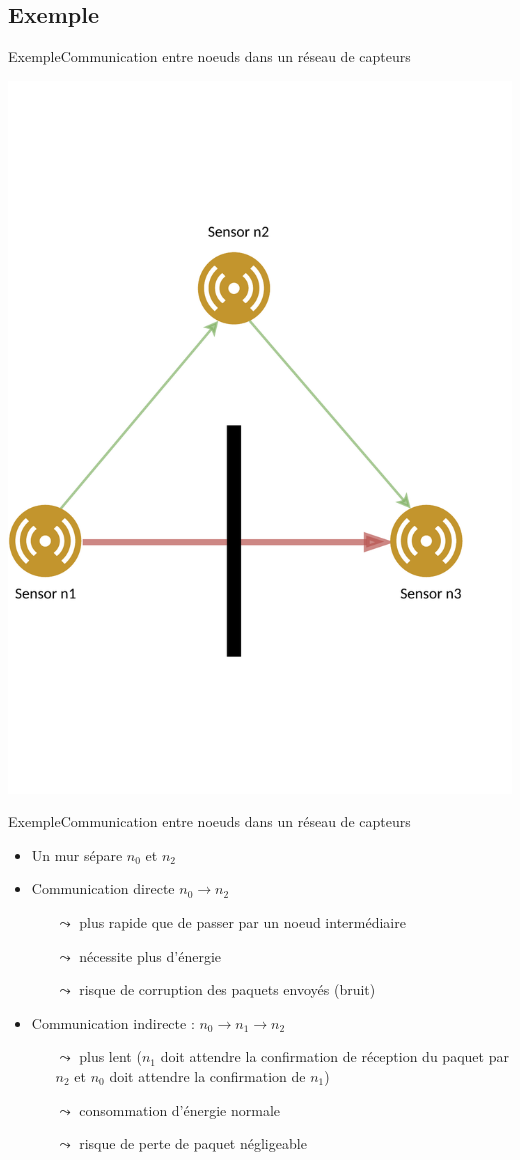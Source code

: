 \documentclass[compress]{beamer}
\theoremstyle{theorem}%
\begin{document}
\subsection{Exemple}
\begin{frame}{Exemple}{Communication entre noeuds dans un réseau de capteurs}
  \begin{center}
    \includegraphics[width=0.65\linewidth]{resources/main-example.pdf}
  \end{center}
\end{frame}

\begin{frame}{Exemple}{Communication entre noeuds dans un réseau de capteurs}
      \begin{itemize}
        \item Un mur sépare $n_0$ et $n_2$
        \item Communication directe $n_0 \rightarrow n_2$
        \begin{itemize}
          \item[$\leadsto$] plus rapide que de passer par un noeud intermédiaire
          \item[$\leadsto$] nécessite plus d'énergie
          \item[$\leadsto$] risque de corruption des paquets envoyés (bruit)
        \end{itemize}
        \item Communication indirecte : $n_0 \rightarrow n_1 \rightarrow n_2$
        \begin{itemize}
          \item[$\leadsto$] plus lent ($n_1$ doit attendre la confirmation de réception du paquet par $n_2$ et $n_0$ doit attendre la confirmation de $n_1$)
          \item[$\leadsto$] consommation d'énergie normale
          \item[$\leadsto$] risque de perte de paquet négligeable
        \end{itemize}
      \end{itemize}
\end{frame}
\end{document}
